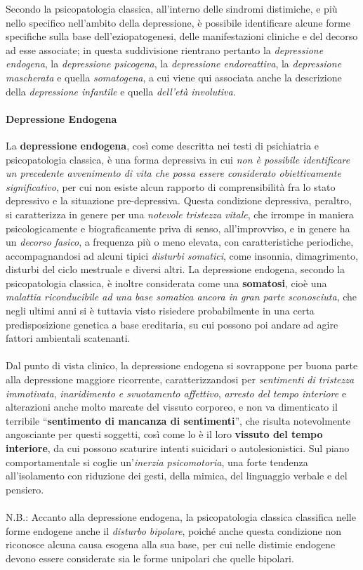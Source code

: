 Secondo la psicopatologia classica, all'interno delle sindromi
distimiche, e più nello specifico nell'ambito della depressione, è
possibile identificare alcune forme specifiche sulla base
dell'eziopatogenesi, delle manifestazioni cliniche e del decorso ad esse
associate; in questa suddivisione rientrano pertanto la
\emph{depressione endogena}, la \emph{depressione psicogena}, la
\emph{depressione endoreattiva}, la \emph{depressione mascherata} e
quella \emph{somatogena}, a cui viene qui associata anche la descrizione
della \emph{depressione infantile} e quella \emph{dell'età involutiva}.

\paragraph{Depressione Endogena}

La \textbf{depressione endogena}, così come descritta nei testi di
psichiatria e psicopatologia classica, è una forma depressiva in cui
\emph{non è possibile identificare un precedente avvenimento di vita che
possa essere considerato obiettivamente significativo}, per cui non
esiste alcun rapporto di comprensibilità fra lo stato depressivo e la
situazione pre-depressiva. Questa condizione depressiva, peraltro, si
caratterizza in genere per una \emph{notevole tristezza vitale}, che
irrompe in maniera psicologicamente e biograficamente priva di senso,
all'improvviso, e in genere ha un \emph{decorso fasico}, a frequenza più
o meno elevata, con caratteristiche periodiche, accompagnandosi ad
alcuni tipici \emph{disturbi somatici}, come insonnia, dimagrimento,
disturbi del ciclo mestruale e diversi altri. La depressione endogena,
secondo la psicopatologia classica, è inoltre considerata come una
\textbf{somatosi}, cioè una \emph{malattia riconducibile ad una base
somatica ancora in gran parte sconosciuta}, che negli ultimi anni si è
tuttavia visto risiedere probabilmente in una certa predisposizione
genetica a base ereditaria, su cui possono poi andare ad agire fattori
ambientali scatenanti.
\\\\
Dal punto di vista clinico, la depressione endogena si sovrappone per
buona parte alla depressione maggiore ricorrente, caratterizzandosi per
\emph{sentimenti di tristezza immotivata}, \emph{inaridimento e
svuotamento affettivo}, \emph{arresto del tempo interiore} e alterazioni
anche molto marcate del vissuto corporeo, e non va dimenticato il
terribile ``\textbf{sentimento di mancanza di sentimenti}'', che risulta
notevolmente angosciante per questi soggetti, così come lo è il loro
\textbf{vissuto del tempo interiore}, da cui possono scaturire intenti
suicidari o autolesionistici. Sul piano comportamentale si coglie
un'\emph{inerzia psicomotoria}, una forte tendenza all'isolamento con
riduzione dei gesti, della mimica, del linguaggio verbale e del
pensiero.
\\\\
N.B.: Accanto alla depressione endogena, la psicopatologia classica
classifica nelle forme endogene anche il \emph{disturbo bipolare},
poiché anche questa condizione non riconosce alcuna causa esogena alla
sua base, per cui nelle distimie endogene devono essere considerate sia
le forme unipolari che quelle bipolari.

